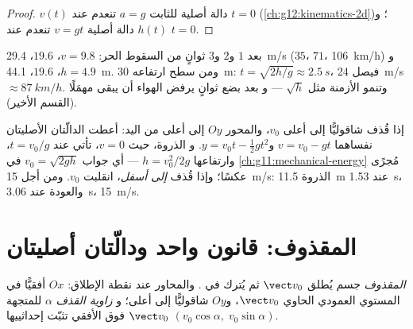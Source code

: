 \begin{proof}
$v(t)$ دالة أصلية للثابت $a = g$ تنعدم عند $t = 0$
(\cref{ch:g12:kinematics-2d})؛ و$h(t)$ دالة أصلية  $v = gt$ تنعدم عند $t = 0$.
\end{proof}

\begin{example}\label{ex:g12:projectile-motion:orders}
بعد $1$ و$2$ و$3$ ثوانٍ من السقوط الحر: $v = 9.8$، $19.6$، \qty{29.4}{m/s}
($35$، $71$، \qty{106}{km/h}) و$h = 4.9$، $19.6$، \qty{44.1}{m}. ومن سطح
ارتفاعه \qty{30}{m}: $t = \sqrt{2h/g} \approx \qty{2.5}{s}$، فيصل 
\qty{24}{m/s} $\approx \qty{87}{km/h}$. وتنمو الأزمنة مثل $\sqrt h$ --- و
بعد بضع ثوانٍ يرفض الهواء أن يبقى مهمَلًا (القسم الأخير).
\end{example}

\begin{example}\label{ex:g12:projectile-motion:throw}
إذا قُذف شاقوليًّا إلى أعلى  $v_0$، والمحور $Oy$ إلى أعلى من اليد: أعطت الدالّتان
الأصليتان نفساهما $v = v_0 - gt$ و$y = v_0 t - \tfrac12 gt^2$. و
الذروة، حيث $v = 0$، تأتي عند $t = v_0/g$، وارتفاعها $h = v_0^2/2g$ --- أي جواب
 $v_0 = \sqrt{2gh}$ في \cref{ch:g11:mechanical-energy} مُجرًى
عكسًا؛ وإذا قُذف \emph{إلى أسفل}، انقلبت  $v_0$. ومن أجل \qty{15}{m/s}: الذروة
\qty{11.5}{m} عند \qty{1.53}{s}، والعودة عند \qty{3.06}{s}،  \qty{15}{m/s}.
\end{example}

\section{المقذوف: قانون واحد ودالّتان أصليتان}

\begin{definition}[المقذوف]\label{def:g12:projectile-motion:projectile}
\emph{المقذوف} جسم يُطلق 
$\vect v_0$ ثم يُترك في . والمحاور عند نقطة الإطلاق: $Ox$
أفقيًّا في المستوي العمودي الحاوي $\vect v_0$، و$Oy$ شاقوليًّا إلى أعلى؛ و
\emph{زاوية القذف} $\alpha$ للمتجهة $\vect v_0$ فوق
الأفقي تثبّت إحداثييها $(v_0\cos\alpha,\; v_0\sin\alpha)$.
\end{definition}

